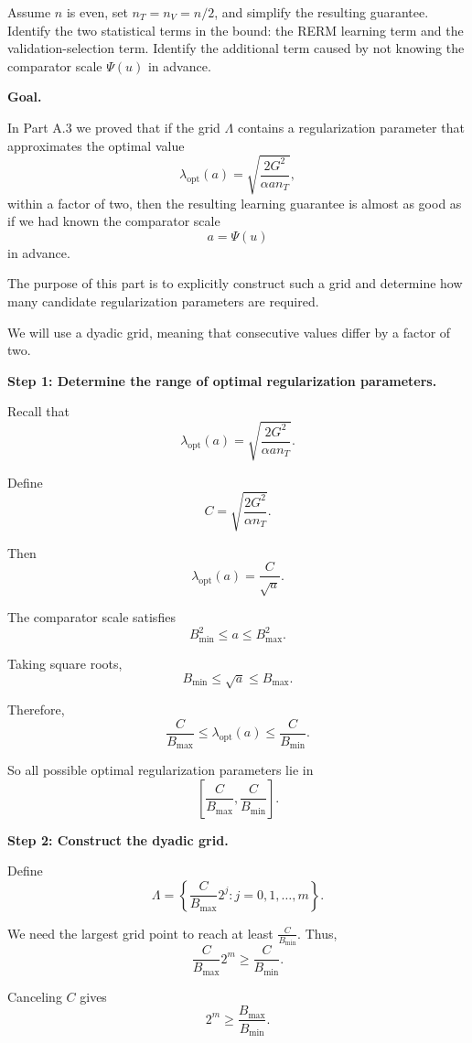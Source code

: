 \documentclass[11pt]{article}
\begin{document}
\begin{enumerate}
Assume $n$ is even, set $n_T=n_V=n/2$, and simplify the resulting guarantee. Identify the two statistical terms in the bound: the RERM learning term and the validation-selection term. Identify the additional term caused by not knowing the comparator scale $\Psi(u)$ in advance.

\begin{solutionbox}

\textbf{Goal.}

In Part A.3 we proved that if the grid $\Lambda$ contains a regularization parameter that approximates the optimal value
\[
\lambda_{\mathrm{opt}}(a)
=
\sqrt{\frac{2G^2}{\alpha a n_T}},
\]
within a factor of two, then the resulting learning guarantee is almost as good as if we had known the comparator scale
\[
a=\Psi(u)
\]
in advance.

The purpose of this part is to explicitly construct such a grid and determine how many candidate regularization parameters are required.

We will use a dyadic grid, meaning that consecutive values differ by a factor of two.

\medskip

\textbf{Step 1: Determine the range of optimal regularization parameters.}

Recall that
\[
\lambda_{\mathrm{opt}}(a)
=
\sqrt{
\frac{2G^2}
     {\alpha a n_T}
}.
\]

Define
\[
C
=
\sqrt{
\frac{2G^2}
     {\alpha n_T}
}.
\]

Then
\[
\lambda_{\mathrm{opt}}(a)
=
\frac{C}{\sqrt a}.
\]

The comparator scale satisfies
\[
B_{\min}^2
\le
a
\le
B_{\max}^2.
\]

Taking square roots,
\[
B_{\min}
\le
\sqrt a
\le
B_{\max}.
\]

Therefore,
\[
\frac{C}{B_{\max}}
\le
\lambda_{\mathrm{opt}}(a)
\le
\frac{C}{B_{\min}}.
\]

So all possible optimal regularization parameters lie in
\[
\left[
\frac{C}{B_{\max}},
\frac{C}{B_{\min}}
\right].
\]

\medskip

\textbf{Step 2: Construct the dyadic grid.}

Define
\[
\Lambda
=
\left\{
\frac{C}{B_{\max}}2^j
:
j=0,1,\ldots,m
\right\}.
\]

We need the largest grid point to reach at least $\frac{C}{B_{\min}}$. Thus,
\[
\frac{C}{B_{\max}}2^m
\ge
\frac{C}{B_{\min}}.
\]

Canceling $C$ gives
\[
2^m
\ge
\frac{B_{\max}}{B_{\min}}.
\]


\end{solutionbox}
\end{enumerate}
\end{document}
